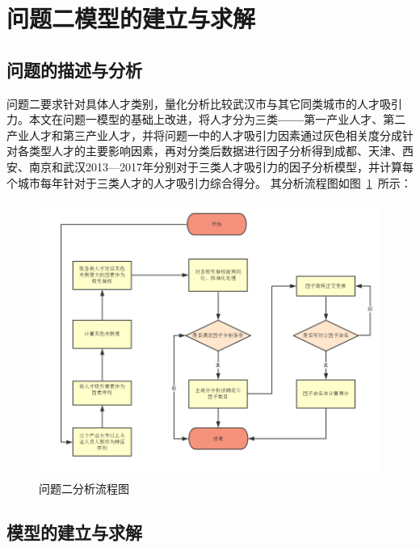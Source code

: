 \documentclass{whutmod}
\begin{document}
	
	
	\section{问题二模型的建立与求解}
	\subsection{问题的描述与分析}
	问题二要求针对具体人才类别，量化分析比较武汉市与其它同类城市的人才吸引力。本文在问题一模型的基础上改进，将人才分为三类\textbf{——}第一产业人才、第二产业人才和第三产业人才，并将问题一中的人才吸引力因素通过灰色相关度分成针对各类型人才的主要影响因素，再对分类后数据进行因子分析得到成都、天津、西安、南京和武汉2013—2017年分别对于三类人才吸引力的因子分析模型，并计算每个城市每年针对于三类人才的人才吸引力综合得分。 其分析流程图如图~\ref{2222}~所示：
	
	\begin{figure}[H]
	\centering
	\includegraphics[width=\textwidth]{figures/2222.png}
	\caption{问题二分析流程图}\label{2222}
	\end{figure}



	\subsection{模型的建立与求解}
\end{document}
